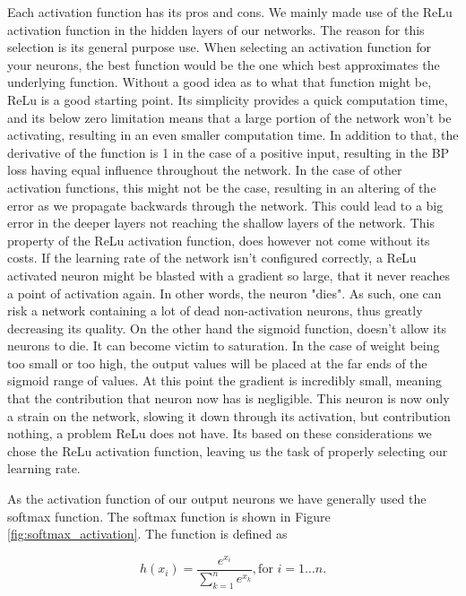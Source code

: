 Each activation function has its pros and cons. We mainly made use of the
\gls{ReLu} activation function in the hidden layers of our networks. The
reason for this selection is its general purpose use. When selecting an
activation function for your neurons, the best function would be the one which
best approximates the underlying function. Without a good idea as to what
that function might be, \gls{ReLu} is a good starting point. Its simplicity
provides a quick computation time, and its below zero limitation means that a
large portion of the network won't be activating, resulting in an even smaller
computation time. In addition to that, the derivative of the function is 1
in the case of a positive input, resulting in the \gls{BP} loss having equal
influence throughout the network. In the case of other activation functions,
this might not be the case, resulting in an altering of the error as we
propagate backwards through the network. This could lead to a big error in the
deeper layers not reaching the shallow layers of the network. This property of
the \gls{ReLu} activation function, does however not come without its costs.
If the learning rate of the network isn't configured correctly, a \gls{ReLu}
activated neuron might be blasted with a gradient so large, that it never
reaches a point of activation again. In other words, the neuron "dies". As such,
one can risk a network containing a lot of dead non-activation neurons, thus
greatly decreasing its quality. On the other hand the sigmoid function, doesn't
allow its neurons to die. It can become victim to saturation. In the case of
weight being too small or too high, the output values will be placed at the far
ends of the sigmoid range of values. At this point the gradient is incredibly
small, meaning that the contribution that neuron now has is negligible. This
neuron is now only a strain on the network, slowing it down through its
activation, but contribution nothing, a problem \gls{ReLu} does not have. Its
based on these considerations we chose the \gls{ReLu} activation function,
leaving us the task of properly selecting our learning rate.\cite{JiYan,
AndrejKarpathy, AvinashSharmaV}

As the activation function of our output neurons we have generally
used the softmax function. The softmax function is shown in Figure
\ref{fig:softmax_activation}. The function is defined as

\begin{equation}
    h(x_i) = \frac{e^{x_i}}{\sum_{k=1}^n e^{x_k}}, \text{for $i = 1 \dots n$}.
\end{equation}

